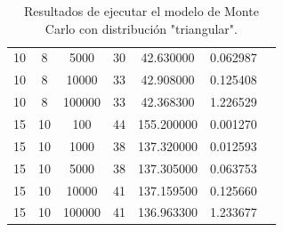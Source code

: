 \documentclass[11pt,a4paper]{report}
\begin{document}
\begin{table}[H]
{\begin{tabular}{|c|c|c|c|c|c|c|}
        10 & 8 & 5000 & 30 & 42.630000 & 0.062987 \\ 
        10 & 8 & 10000 & 33 & 42.908000 & 0.125408 \\ 
        10 & 8 & 100000 & 33 & 42.368300 & 1.226529 \\ \hline
        15 & 10 & 100 & 44 & 155.200000 & 0.001270 \\ 
        15 & 10 & 1000 & 38 & 137.320000 & 0.012593 \\ 
        15 & 10 & 5000 & 38 & 137.305000 & 0.063753 \\ 
        15 & 10 & 10000 & 41 & 137.159500 & 0.125660 \\ 
        15 & 10 & 100000 & 41 & 136.963300 & 1.233677 \\ \hline
\end{tabular}
}%
\caption{Resultados de ejecutar el modelo de Monte Carlo con distribución "triangular".}
\label{tabla3}
\end{table}
\end{document}

